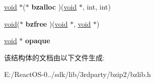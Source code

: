 \begin{DoxyCompactItemize}
\mbox{\label{structbz__stream_a1c50a6e31e7d6c9724b00e470802df1a}} 
\hyperlink{interfacevoid}{void} $\ast$($\ast$ {\bfseries bzalloc} )(\hyperlink{interfacevoid}{void} $\ast$, int, int)
\item 
\mbox{\label{structbz__stream_a02d0890b69f8f3e07f81ee857e00359c}} 
\hyperlink{interfacevoid}{void}($\ast$ {\bfseries bzfree} )(\hyperlink{interfacevoid}{void} $\ast$, \hyperlink{interfacevoid}{void} $\ast$)
\item 
\mbox{\label{structbz__stream_a8e000913c058c83abd1ec96c6aef302a}} 
\hyperlink{interfacevoid}{void} $\ast$ {\bfseries opaque}
\end{DoxyCompactItemize}


该结构体的文档由以下文件生成\+:\begin{DoxyCompactItemize}
\item 
E\+:/\+React\+O\+S-\/0../sdk/lib/3rdparty/bzip2/bzlib.\+h\end{DoxyCompactItemize}
